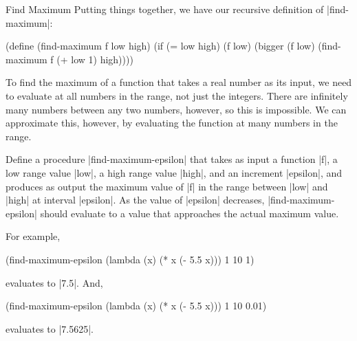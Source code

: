 \begin{schemeregion}
\begin{examplenobar}{Find Maximum\label{ex:maximum}}
Putting things together, we have our recursive definition of \scheme|find-maximum|:
\begin{schemedisplay}
(define (find-maximum f low high)
  (if (= low high) 
    (f low)
    (bigger (f low) (find-maximum f (+ low 1) high))))
\end{schemedisplay}
\end{examplenobar}

\beforesplitex
\begin{exercise}\greenstar
To find the maximum of a function that takes a real number as its input, we need to evaluate at all numbers in the range, not just the integers.  There are infinitely many numbers between any two numbers, however, so this is impossible.  We can approximate this, however, by evaluating the function at many numbers in the range.  

Define a procedure \scheme|find-maximum-epsilon| that takes as input a function \scheme|f|, a low range value \scheme|low|, a high range value \scheme|high|, and an increment \scheme|epsilon|, and produces as output the maximum value of \scheme|f| in the range between \scheme|low| and \scheme|high| at interval \scheme|epsilon|.  As the value of \scheme|epsilon| decreases, \scheme|find-maximum-epsilon| should evaluate to a value that approaches the actual maximum value. 

For example, 
\begin{schemedisplay}
(find-maximum-epsilon (lambda (x) (* x (- 5.5 x))) 1 10 1)
\end{schemedisplay}
evaluates to \schemeresult|7.5|.  And,
\begin{schemedisplay}
(find-maximum-epsilon (lambda (x) (* x (- 5.5 x))) 1 10 0.01)
\end{schemedisplay}
evaluates to \schemeresult|7.5625|.
\end{exercise}
\aftersplitex


\end{schemeregion}
